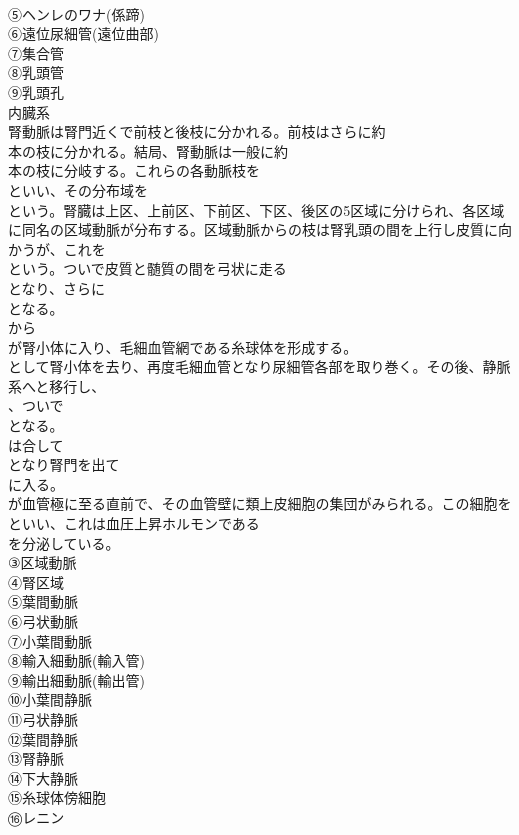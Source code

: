 \documentclass[8pt]{extreport}
\begin{document}
\begin{CJK}{UTF8}{min}
\\	⑤ヘンレのワナ(係蹄)
\\	⑥遠位尿細管(遠位曲部)
\\	⑦集合管
\\	⑧乳頭管
\\	⑨乳頭孔
\\	内臓系
\\	腎動脈は腎門近くで前枝と後枝に分かれる。前枝はさらに約
\\	本の枝に分かれる。結局、腎動脈は一般に約
\\	本の枝に分岐する。これらの各動脈枝を
\\	といい、その分布域を
\\	という。腎臓は上区、上前区、下前区、下区、後区の5区域に分けられ、各区域に同名の区域動脈が分布する。区域動脈からの枝は腎乳頭の間を上行し皮質に向かうが、これを
\\	という。ついで皮質と髄質の間を弓状に走る
\\	となり、さらに
\\	となる。
\\	から
\\	が腎小体に入り、毛細血管網である糸球体を形成する。
\\	として腎小体を去り、再度毛細血管となり尿細管各部を取り巻く。その後、静脈系へと移行し、
\\	、ついで
\\	となる。
\\	は合して
\\	となり腎門を出て
\\	に入る。
\\	が血管極に至る直前で、その血管壁に類上皮細胞の集団がみられる。この細胞を
\\	といい、これは血圧上昇ホルモンである
\\	を分泌している。	
\\	③区域動脈
\\	④腎区域
\\	⑤葉間動脈
\\	⑥弓状動脈
\\	⑦小葉間動脈
\\	⑧輸入細動脈(輸入管)
\\	⑨輸出細動脈(輸出管)
\\	⑩小葉間静脈
\\	⑪弓状静脈
\\	⑫葉間静脈
\\	⑬腎静脈
\\	⑭下大静脈
\\	⑮糸球体傍細胞
\\	⑯レニン

\end{CJK}
\end{document}

